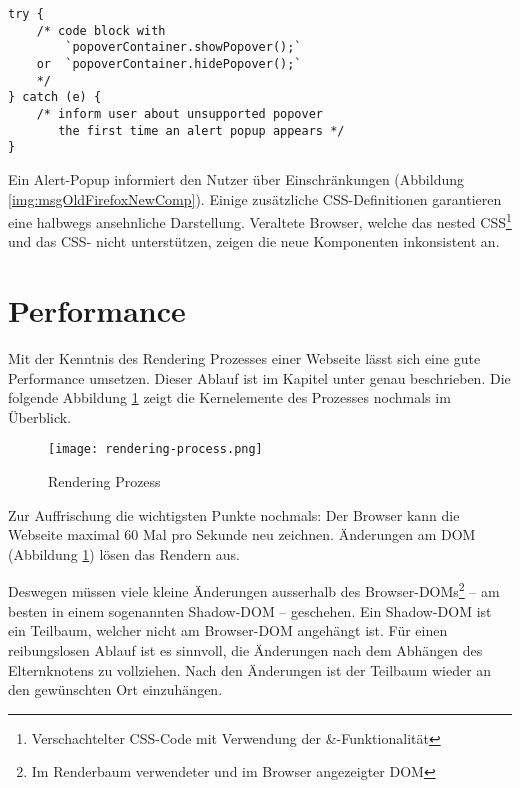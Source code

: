 \begin{lstlisting}[style = htmlcssjs, caption = Workaround für ältere Browser, label = code:popoverWorkaround]
try {
    /* code block with 
        `popoverContainer.showPopover();`
    or  `popoverContainer.hidePopover();`
    */
} catch (e) {
    /* inform user about unsupported popover 
       the first time an alert popup appears */
}
\end{lstlisting}

Ein Alert-Popup informiert den Nutzer über Einschränkungen (Abbildung \ref{img:msgOldFirefoxNewComp}). 
Einige zusätzliche CSS-Definitionen garantieren eine halbwegs ansehnliche Darstellung. 
Veraltete Browser, welche das nested CSS\footnote{
    Verschachtelter CSS-Code mit Verwendung der \&-Funktionalität
} und das CSS- nicht unterstützen, zeigen die neue Komponenten inkonsistent an. 


\section{Performance}
\label{sec:performance}

Mit der Kenntnis des Rendering Prozesses einer Webseite lässt sich eine gute Performance umsetzen. 
Dieser Ablauf ist im Kapitel \textbf{} unter \textbf{} genau beschrieben. 
Die folgende Abbildung \ref{img:renderingProcessRecap} zeigt die Kernelemente des Prozesses nochmals im Überblick. 

\begin{figure}[!htb]
    \centering
    \texttt{[image: rendering-process.png]}
    \caption{\centering Rendering Prozess}
    \label{img:renderingProcessRecap}
\end{figure}

Zur Auffrischung die wichtigsten Punkte nochmals: 
Der Browser kann die Webseite maximal 60 Mal pro Sekunde neu zeichnen. 
Änderungen am DOM (Abbildung \ref{img:renderingProcessRecap}) lösen das Rendern aus. 

Deswegen müssen viele kleine Änderungen ausserhalb des Browser-DOMs\footnote{
    Im Renderbaum verwendeter und im Browser angezeigter DOM
} – am besten in einem sogenannten Shadow-DOM – geschehen. 
Ein Shadow-DOM ist ein Teilbaum, welcher nicht am Browser-DOM angehängt ist. 
Für einen reibungslosen Ablauf ist es sinnvoll, die Änderungen nach dem Abhängen des Elternknotens zu vollziehen. 
Nach den Änderungen ist der Teilbaum wieder an den gewünschten Ort einzuhängen. 

